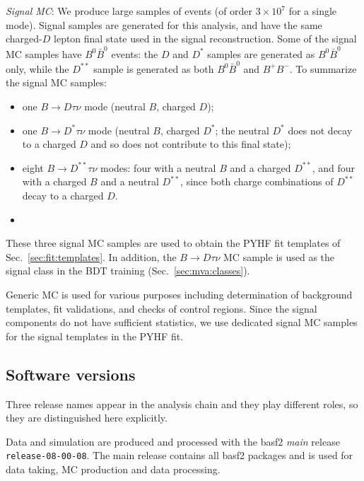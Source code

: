 \emph{Signal MC}: We produce large samples of events (of order $3\times10^{7}$
for a single mode).
Signal samples are generated for this analysis, and have the same
charged-$D$ lepton final state used in the signal reconstruction.
Some of the signal MC samples have $B^{0}\bar{B}^{0}$ events: the $D$ and $D^{*}$ samples are generated
as $B^{0}\bar{B}^{0}$ only, while the $D^{**}$ sample is generated as both
$B^{0}\bar{B}^{0}$ and $B^{+}B^{-}$.  To summarize the signal MC samples:
\begin{itemize}
  \item one $B \to D\tau\nu$ mode (neutral $B$, charged $D$);
  \item one $B \to D^{*}\tau\nu$ mode (neutral $B$, charged $D^{*}$; the
        neutral $D^{*}$ does not decay to a charged $D$ and so does not
        contribute to this final state);
  \item eight $B \to D^{**}\tau\nu$ modes: four with a neutral $B$ and a
        charged $D^{**}$, and four with a charged $B$ and a neutral
        $D^{**}$, since both charge combinations of $D^{**}$ decay to a
        charged $D$.

        \item {}
\end{itemize}
These three signal MC samples are used to obtain the PYHF fit templates of
Sec.~\ref{sec:fit:templates}. In addition, the $B\to D\tau\nu$ MC sample is used 
as the signal class in the BDT training (Sec.~\ref{sec:mva:classes}).

Generic MC is used for various purposes including determination of background templates, fit validations, and checks of control regions.
Since the signal components do not have sufficient statistics, we use dedicated signal MC samples 
for the signal templates in the PYHF fit.



 
\subsection{Software versions}
\label{sec:data:software}

Three release names appear in the analysis chain and they play different
roles, so they are distinguished here explicitly.

Data and simulation are produced and processed with the basf2 \emph{main}
release \texttt{release-08-00-08}.
The main release contains all basf2 packages and is used for data
taking, MC production and data processing.

